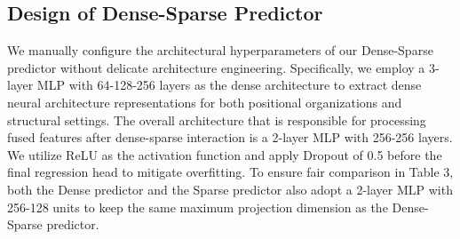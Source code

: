 \documentclass[10pt,twocolumn,letterpaper]{article}
\begin{document}
\subsection{Design of Dense-Sparse Predictor}
We manually configure the architectural hyperparameters of our Dense-Sparse predictor without delicate architecture engineering.
Specifically, we employ a 3-layer MLP with 64-128-256 layers as the dense architecture to extract dense neural architecture representations for both positional organizations and structural settings.
The overall architecture that is responsible for processing fused features after dense-sparse interaction is a 2-layer MLP with 256-256 layers. We utilize ReLU as the activation function and apply Dropout of 0.5 before the final regression head to mitigate overfitting. To ensure fair comparison in Table 3, both the Dense predictor and the Sparse predictor also adopt a 2-layer MLP with 256-128 units to keep the same maximum projection dimension as the Dense-Sparse predictor.

{\small


}

\newpage
\appendix
\end{document}
